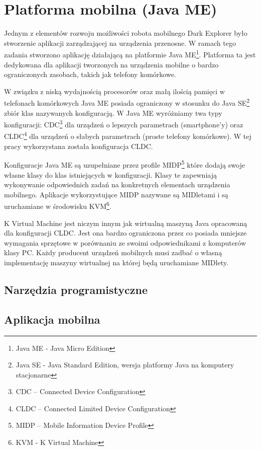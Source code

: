 \section{Platforma mobilna (Java ME)}
Jednym z elementów rozwoju możliwości robota mobilnego Dark Explorer było stworzenie aplikacji zarządzającej na urządzenia przenosne. W ramach tego zadania stworzono aplikację działającą na platformie Java ME\footnote{Java ME - Java Micro Edition}. Platforma ta jest dedykowana dla aplikacji tworzonych na urządzenia mobilne o bardzo ograniczonych zasobach, takich jak telefony komórkowe. 

W związku z niską wydajnością procesorów oraz małą ilością pamięci w telefonach komórkowych Java ME posiada ograniczony w stosunku do Java SE\footnote{Java SE - Java Standard Edition, wersja platformy Java na komputery stacjonarne} zbiór klas nazywanych konfiguracją. W Java ME wyróżniamy twa typy konfiguracji: CDC\footnote{CDC -- Connected Device Configuration} dla urządzeń o lepszych parametrach (smartphone'y) oraz CLDC\footnote{CLDC -- Connected Limited Device Configuration} dla urządzeń o słabych parametrach (proste telefony komórkowe). W tej pracy wykorzystana została konfiguracja CLDC.

Konfiguracje Java ME są uzupełniane przez profile MIDP\footnote{MIDP -- Mobile Information Device Profile} które dodają swoje własne klasy do klas istniejących w konfiguracji. Klasy te zapewniają wykonywanie odpowiednich zadań na konkretnych elementach urządzenia mobilnego. Aplikacje wykorzystujące MIDP nazywane są MIDletami i są uruchamiane w środowisku KVM\footnote{KVM - K Virtual Machine}.

K Virtual Machine jest niczym innym jak wirtualną maszyną Java opracowaną dla konfiguracji CLDC. Jest ona bardzo ograniczona przez co posiada mniejsze wymagania sprzętowe w porównaniu ze swoimi odpowiednikami z komputerów klasy PC. Każdy producent urządzeń mobilnych musi zadbać o własną implementację maszyny wirtualnej na której będą uruchamiane MIDlety.
\subsection{Narzędzia programistyczne}

\subsection{Aplikacja mobilna}